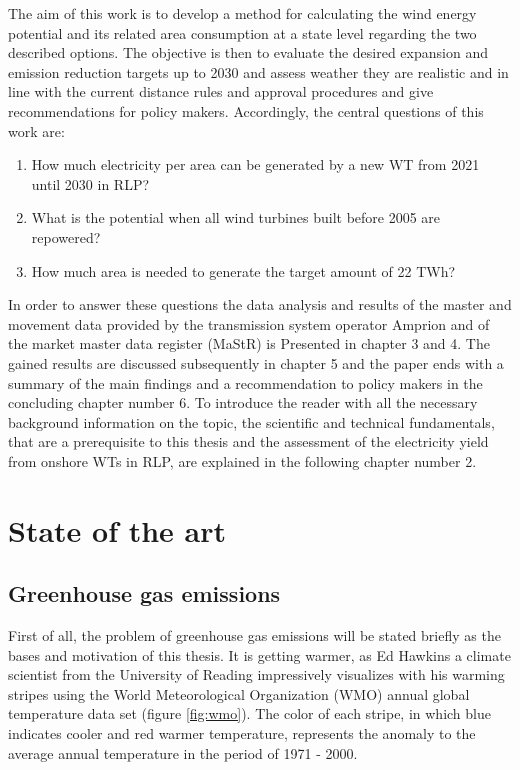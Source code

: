 \documentclass[a4paper,11pt]{article}
\begin{document}
The aim of this work is to develop a method for calculating the wind energy potential and its related area consumption at a state level regarding the two described options. The objective is then to evaluate the desired expansion and emission reduction targets up to 2030 and assess weather they are realistic and in line with the current distance rules and approval procedures and give recommendations for policy makers. Accordingly, the central questions of this work are:
\begin{enumerate}
\def\labelenumi{\arabic{enumi}.}
\item
  How much electricity per area can be generated by a new WT from 2021 until 2030 in RLP?
\item
  What is the potential when all wind turbines built before 2005 are repowered?
\item
  How much area is needed to generate the target amount of 22 TWh?
\end{enumerate}
In order to answer these questions the data analysis and results of the master and movement data provided by the transmission system operator Amprion and of the market master data register (MaStR) is Presented in chapter 3 and 4. The gained results are discussed subsequently in chapter 5 and the paper ends with a summary of the main findings and a recommendation to policy makers in the concluding chapter number 6. To introduce the reader with all the necessary background information on the topic, the scientific and technical fundamentals, that are a prerequisite to this thesis and the assessment of the electricity yield from onshore WTs in RLP, are explained in the following chapter number 2.

\newpage

\hypertarget{state-of-the-art}{%
\section{State of the art}\label{state-of-the-art}}

\hypertarget{greenhouse-gas-emissions}{%
\subsection{Greenhouse gas emissions}\label{greenhouse-gas-emissions}}

First of all, the problem of greenhouse gas emissions will be stated briefly as the bases and motivation of this thesis. It is getting warmer, as Ed Hawkins a climate scientist from the University of Reading impressively visualizes with his warming stripes using the World Meteorological Organization (WMO) annual global temperature data set (figure \ref{fig:wmo}). The color of each stripe, in which blue indicates cooler and red warmer temperature, represents the anomaly to the average annual temperature in the period of 1971 - 2000.
\end{document}

